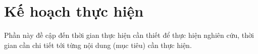 \section{Kế hoạch thực hiện}
\label{planing}

Phần này đề cập đến thời gian thực hiện cần thiết để thực hiện nghiên cứu, thời gian cần chi tiết tới từng nội dung (mục tiêu) cần thực hiện.